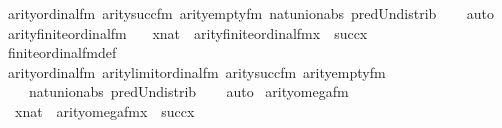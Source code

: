 \begin{isabellebody}
\ arity{\isacharunderscore}{\kern0pt}ordinal{\isacharunderscore}{\kern0pt}fm\ arity{\isacharunderscore}{\kern0pt}succ{\isacharunderscore}{\kern0pt}fm\ arity{\isacharunderscore}{\kern0pt}empty{\isacharunderscore}{\kern0pt}fm\ nat{\isacharunderscore}{\kern0pt}union{\isacharunderscore}{\kern0pt}abs{}\ pred{\isacharunderscore}{\kern0pt}Un{\isacharunderscore}{\kern0pt}distrib\isanewline
\ \ \isamarkupfalse%
\ auto%
\endisatagproof
{\isafoldproof}%
%
\isadelimproof
\isanewline
%
\endisadelimproof
\isanewline
{}\isamarkupfalse%
\ arity{\isacharunderscore}{\kern0pt}finite{\isacharunderscore}{\kern0pt}ordinal{\isacharunderscore}{\kern0pt}fm\ {\isacharcolon}{\kern0pt}\isanewline
\ \ {\isachardoublequoteopen}{\isasymlbrakk}x{\isasymin}nat{\isasymrbrakk}\ {\isasymLongrightarrow}\ arity{\isacharparenleft}{\kern0pt}finite{\isacharunderscore}{\kern0pt}ordinal{\isacharunderscore}{\kern0pt}fm{\isacharparenleft}{\kern0pt}x{\isacharparenright}{\kern0pt}{\isacharparenright}{\kern0pt}\ {\isacharequal}{\kern0pt}\ succ{\isacharparenleft}{\kern0pt}x{\isacharparenright}{\kern0pt}{\isachardoublequoteclose}\isanewline
%
\isadelimproof
\ \ %
\endisadelimproof
%
\isatagproof
{}\isamarkupfalse%
\ finite{\isacharunderscore}{\kern0pt}ordinal{\isacharunderscore}{\kern0pt}fm{\isacharunderscore}{\kern0pt}def\ \isanewline
\ \ \isamarkupfalse%
\ arity{\isacharunderscore}{\kern0pt}ordinal{\isacharunderscore}{\kern0pt}fm\ arity{\isacharunderscore}{\kern0pt}limit{\isacharunderscore}{\kern0pt}ordinal{\isacharunderscore}{\kern0pt}fm\ arity{\isacharunderscore}{\kern0pt}succ{\isacharunderscore}{\kern0pt}fm\ arity{\isacharunderscore}{\kern0pt}empty{\isacharunderscore}{\kern0pt}fm\ \isanewline
\ \ \ \ nat{\isacharunderscore}{\kern0pt}union{\isacharunderscore}{\kern0pt}abs{}\ pred{\isacharunderscore}{\kern0pt}Un{\isacharunderscore}{\kern0pt}distrib\isanewline
\ \ \isamarkupfalse%
\ auto%
\endisatagproof
{\isafoldproof}%
%
\isadelimproof
\isanewline
%
\endisadelimproof
\isanewline
{}\isamarkupfalse%
\ arity{\isacharunderscore}{\kern0pt}omega{\isacharunderscore}{\kern0pt}fm\ {\isacharcolon}{\kern0pt}\isanewline
\ \ {\isachardoublequoteopen}{\isasymlbrakk}x{\isasymin}nat{\isasymrbrakk}\ {\isasymLongrightarrow}\ arity{\isacharparenleft}{\kern0pt}omega{\isacharunderscore}{\kern0pt}fm{\isacharparenleft}{\kern0pt}x{\isacharparenright}{\kern0pt}{\isacharparenright}{\kern0pt}\ {\isacharequal}{\kern0pt}\ succ{\isacharparenleft}{\kern0pt}x{\isacharparenright}{\kern0pt}{\isachardoublequoteclose}\isanewline

\end{isabellebody}
